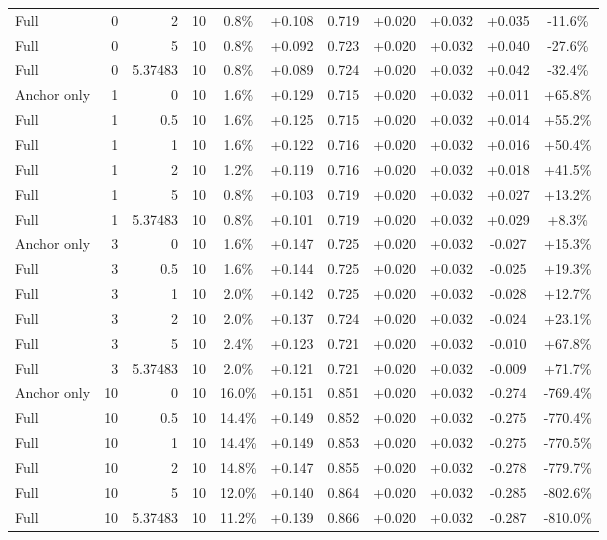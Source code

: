 \begin{table}[htbp]
\begin{tabular}{lrrrccccccc}
Full & 0 & 2 & 10 & 0.8\% & +0.108 & 0.719 & +0.020 & +0.032 & +0.035 & -11.6\% \\
Full & 0 & 5 & 10 & 0.8\% & +0.092 & 0.723 & +0.020 & +0.032 & +0.040 & -27.6\% \\
Full & 0 & 5.37483 & 10 & 0.8\% & +0.089 & 0.724 & +0.020 & +0.032 & +0.042 & -32.4\% \\
Anchor only & 1 & 0 & 10 & 1.6\% & +0.129 & 0.715 & +0.020 & +0.032 & +0.011 & +65.8\% \\
Full & 1 & 0.5 & 10 & 1.6\% & +0.125 & 0.715 & +0.020 & +0.032 & +0.014 & +55.2\% \\
Full & 1 & 1 & 10 & 1.6\% & +0.122 & 0.716 & +0.020 & +0.032 & +0.016 & +50.4\% \\
Full & 1 & 2 & 10 & 1.2\% & +0.119 & 0.716 & +0.020 & +0.032 & +0.018 & +41.5\% \\
Full & 1 & 5 & 10 & 0.8\% & +0.103 & 0.719 & +0.020 & +0.032 & +0.027 & +13.2\% \\
Full & 1 & 5.37483 & 10 & 0.8\% & +0.101 & 0.719 & +0.020 & +0.032 & +0.029 & +8.3\% \\
Anchor only & 3 & 0 & 10 & 1.6\% & +0.147 & 0.725 & +0.020 & +0.032 & -0.027 & +15.3\% \\
Full & 3 & 0.5 & 10 & 1.6\% & +0.144 & 0.725 & +0.020 & +0.032 & -0.025 & +19.3\% \\
Full & 3 & 1 & 10 & 2.0\% & +0.142 & 0.725 & +0.020 & +0.032 & -0.028 & +12.7\% \\
Full & 3 & 2 & 10 & 2.0\% & +0.137 & 0.724 & +0.020 & +0.032 & -0.024 & +23.1\% \\
Full & 3 & 5 & 10 & 2.4\% & +0.123 & 0.721 & +0.020 & +0.032 & -0.010 & +67.8\% \\
Full & 3 & 5.37483 & 10 & 2.0\% & +0.121 & 0.721 & +0.020 & +0.032 & -0.009 & +71.7\% \\
Anchor only & 10 & 0 & 10 & 16.0\% & +0.151 & 0.851 & +0.020 & +0.032 & -0.274 & -769.4\% \\
Full & 10 & 0.5 & 10 & 14.4\% & +0.149 & 0.852 & +0.020 & +0.032 & -0.275 & -770.4\% \\
Full & 10 & 1 & 10 & 14.4\% & +0.149 & 0.853 & +0.020 & +0.032 & -0.275 & -770.5\% \\
Full & 10 & 2 & 10 & 14.8\% & +0.147 & 0.855 & +0.020 & +0.032 & -0.278 & -779.7\% \\
Full & 10 & 5 & 10 & 12.0\% & +0.140 & 0.864 & +0.020 & +0.032 & -0.285 & -802.6\% \\
Full & 10 & 5.37483 & 10 & 11.2\% & +0.139 & 0.866 & +0.020 & +0.032 & -0.287 & -810.0\% \\

\end{tabular}
\end{table}
